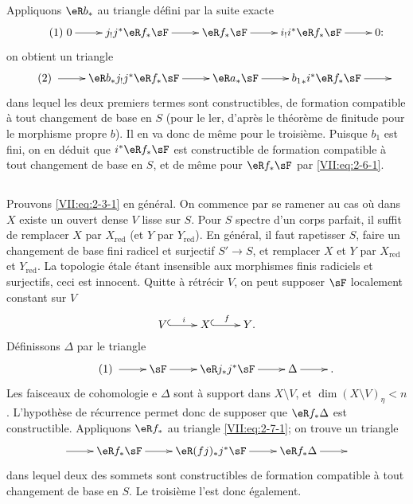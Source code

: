 Appliquons $\eR b_\ast$ au triangle défini par la suite exacte 
\begin{equation*}\tag{1}\label{VII:eq:2-6-1}
\xymatrix{
  0 \ar[r] 
    & j_! j^\ast \eR f_\ast \sF \ar[r] 
    & \eR f_\ast \sF \ar[r] 
    & i_! i^\ast \eR f_\ast \sF \ar[r] 
    & 0 \text{:} 
}
\end{equation*}
on obtient un triangle 
\begin{equation*}\tag{2}\label{VII:eq:2-6-2}
\xymatrix{
  \ar[r] 
    & \eR b_\ast j_! j^\ast \eR f_\ast \sF \ar[r] 
    & \eR a_\ast \sF \ar[r] 
    & {b_1}_\ast i^\ast \eR f_\ast \sF \ar[r] 
    & 
}
\end{equation*}
dans lequel les deux premiers termes sont constructibles, de formation 
compatible à tout changement de base en $S$ (pour le ler, d'après le 
théorème de finitude pour le morphisme propre $b$). Il en va donc de 
même pour le troisième. Puisque $b_1$ est fini, on en déduit que 
$i^\ast \eR f_\ast \sF$ est constructible de formation compatible à tout 
changement de base en $S$, et de même pour $\eR f_\ast \sF$ par 
\eqref{VII:eq:2-6-1}. 





\subsection{}\label{VII:2-7}

Prouvons \eqref{VII:eq:2-3-1} en général. On commence par se ramener au cas 
où dans $X$ existe un ouvert dense $V$ lisse sur $S$. Pour $S$ spectre d'un 
corps parfait, il suffit de remplacer $X$ par $X_\text{red}$ (et $Y$ par 
$Y_\text{red}$). En général, il faut rapetisser $S$, faire un changement de 
base fini radicel et surjectif $S' \to S$, et remplacer $X$ et $Y$ par 
$X_\text{red}$ et $Y_\text{red}$. La topologie étale étant insensible aux 
morphismes finis radiciels et surjectifs, ceci est innocent. Quitte à 
rétrécir $V$, on peut supposer $\sF$ localement constant sur $V$ 
\[\xymatrix{
  V \ar@{^{(}->}[r]^i 
    & X \ar@{^{(}->}[r]^-f 
    & Y \text{.} 
}\]
Définissons $\Delta$ par le triangle 
\begin{equation*}\tag{1}\label{VII:eq:2-7-1}
\xymatrix{
  \ar[r] 
    & \sF \ar[r] 
    & \eR j_\ast j^\ast \sF \ar[r] 
    & \Delta \ar[r] 
    & \text{.} 
}
\end{equation*}
Les faisceaux de cohomologie e $\Delta$ sont à support dans $X\setminus V$, 
et $\dim(X\setminus V)_\eta < n$. L'hypothèse de récurrence permet donc de 
supposer que $\eR f_\ast \Delta$ est constructible. Appliquons $\eR f_\ast$ au 
triangle \eqref{VII:eq:2-7-1}; on trouve un triangle 
\[\xymatrix{
  \ar[r] 
    & \eR f_\ast \sF \ar[r] 
    & \eR(f j)_\ast j^\ast \sF \ar[r] 
    & \eR f_\ast \Delta \ar[r] 
    & 
}\]
dans lequel deux des sommets sont constructibles de formation compatible à 
tout changement de base en $S$. Le troisième l'est donc également. 





